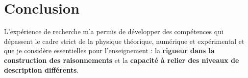 




\section{Conclusion}
L’expérience de recherche m’a permis de développer des compétences qui
dépassent le cadre strict de la physique théorique, numérique et expérimental
et que je considère essentielles pour l’enseignement : la \textbf{rigueur dans
    la construction des raisonnements} et la \textbf{capacité à relier des niveaux
    de description différents}.


